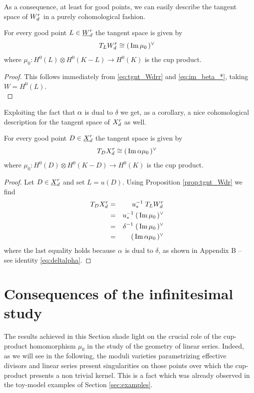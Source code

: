 	As a consequence, at least for good points, we can easily describe the tangent space of $W_d^r$ in a purely cohomological fashion.
	\begin{prop}\label{prop:tgnt_Wdr}
		For every good point $L\in \underline{W}_d^{r}$ the tangent space is given by
		$$ T_LW_d^r \cong (\,\operatorname{Im} \mu_{0}\,)^{\vee} $$
		where $ \mu_{0} : H^0(L)\otimes H^0(K-L) \to H^0(K) $ is the cup product.
	\end{prop}
	\begin{proof}
		This follows immediately from \eqref{eq:tgnt_Wdrr} and \eqref{eq:im_beta_*}, taking $W=H^0(L)$.\\
	\end{proof}
	Exploiting the fact that $\alpha$ is dual to $\delta$ we get, as a corollary, a nice cohomological description for the tangent space of $X_d^r$ as well.
	\begin{coro}\label{coro:tgnt_Xdr}
		For every good point $D\in \underline{X}_d^{r}$ the tangent space is given by
		$$ T_DX_d^r \cong (\,\operatorname{Im} \alpha \mu_{0}\,)^{\vee} $$
		where $ \mu_{0} : H^0(D)\otimes H^0(K-D) \to H^0(K) $ is the cup product.
	\end{coro}
	\begin{proof}
		Let $D \in \underline{X}_d^{r}$ and set $L=u(D)$. Using Proposition \ref{prop:tgnt_Wdr} we find
		\begin{eqnarray*}
			T_D X_d^r 
			&=& u_{*}^{-1}\; T_L W_d^r \\
			&=& u_{*}^{-1}\: (\,\operatorname{Im} \mu_0\,)^{\vee} \\
			&=& \delta^{-1}\; (\,\operatorname{Im} \mu_0\,)^{\vee} \\
			&=& (\,\operatorname{Im} \alpha \mu_0\,)^{\vee}
		\end{eqnarray*}
		where the last equality holds because $\alpha$ is dual to $\delta$, as shown in Appendix B -- see identity \eqref{eq:deltalpha}.
	\end{proof}


\section{Consequences of the infinitesimal study}

	The results achieved in this Section shade light on the crucial role of the cup-product homomorphism $\mu_0$ in the study of the geometry of linear series. Indeed, as we will see in the following, the moduli varieties parametrizing effective divisors and linear series present singularities on those points over which the cup-product presents a non trivial kernel. This is a fact which was already observed in the toy-model examples of Section \ref{sec:examples}.
	\\

